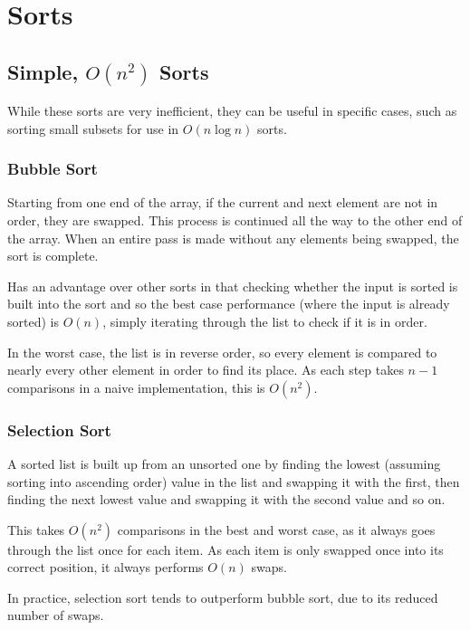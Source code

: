 \documentclass[]{article}
\begin{document}
\pagebreak

\section{Sorts}

\subsection{Simple, $O(n^2)$ Sorts}

While these sorts are very inefficient, they can be useful in specific cases, such as sorting small subsets for use in $O(n\log{n})$ sorts.

\subsubsection{Bubble Sort}

Starting from one end of the array, if the current and next element are not in order, they are swapped. This process is continued all the way to the other end of the array. When an entire pass is made without any elements being swapped, the sort is complete.

Has an advantage over other sorts in that checking whether the input is sorted is built into the sort and so the best case performance (where the input is already sorted) is $O(n)$, simply iterating through the list to check if it is in order.

In the worst case, the list is in reverse order, so every element is compared to nearly every other element in order to find its place. As each step takes $n - 1$ comparisons in a naive implementation, this is $O(n^2)$.

\subsubsection{Selection Sort}

A sorted list is built up from an unsorted one by finding the lowest (assuming sorting into ascending order) value in the list and swapping it with the first, then finding the next lowest value and swapping it with the second value and so on.

This takes $O(n^2)$ comparisons in the best and worst case, as it always goes through the list once for each item. As each item is only swapped once into its correct position, it always performs $O(n)$ swaps.

In practice, selection sort tends to outperform bubble sort, due to its reduced number of swaps.
\end{document}

